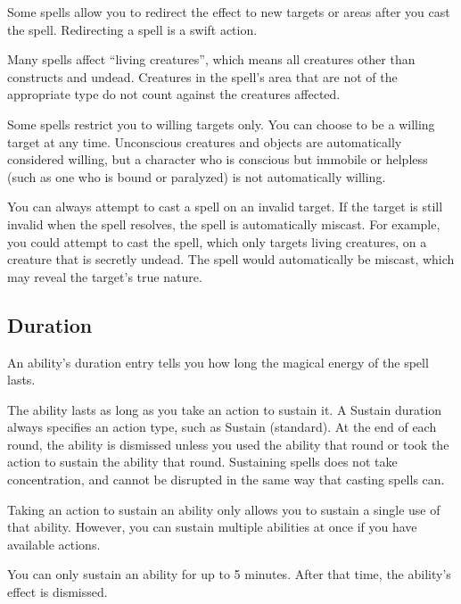          Some spells allow you to redirect the effect to new targets or areas after you cast the spell.
        Redirecting a spell is a swift action.

         Many spells affect ``living creatures'', which means all creatures other than constructs and undead.
        Creatures in the spell's area that are not of the appropriate type do not count against the creatures affected.

         Some spells restrict you to willing targets only.
        You can choose to be a willing target at any time.
        Unconscious creatures and objects are automatically considered willing, but a character who is conscious but immobile or helpless (such as one who is bound or paralyzed) is not automatically willing.

         You can always attempt to cast a spell on an invalid target.
        If the target is still invalid when the spell resolves, the spell is automatically miscast.
        For example, you could attempt to cast the  spell, which only targets living creatures, on a creature that is secretly undead.
        The spell would automatically be miscast, which may reveal the target's true nature.

    \subsection{Duration}

        An ability's duration entry tells you how long the magical energy of the spell lasts.

         The ability lasts as long as you take an action to sustain it.
        A Sustain duration always specifies an action type, such as Sustain (standard).
        At the end of each round, the ability is dismissed unless you used the ability that round or took the action to sustain the ability that round.
        Sustaining spells does not take concentration, and cannot be disrupted in the same way that casting spells can.

        Taking an action to sustain an ability only allows you to sustain a single use of that ability.
        However, you can sustain multiple abilities at once if you have available actions.

        You can only sustain an ability for up to 5 minutes.
        After that time, the ability's effect is dismissed.


